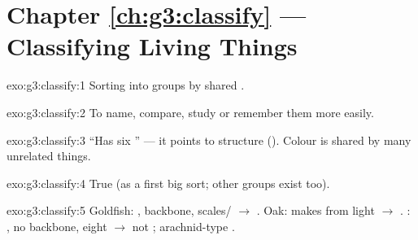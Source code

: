 \section*{Chapter \ref{ch:g3:classify} --- Classifying Living Things}

\begin{solution}{exo:g3:classify:1}
Sorting  into groups by shared .
\end{solution}

\begin{solution}{exo:g3:classify:2}
To name, compare, study or remember them more easily.
\end{solution}

\begin{solution}{exo:g3:classify:3}
``Has six '' --- it points to  structure (). Colour
is shared by many unrelated things.
\end{solution}

\begin{solution}{exo:g3:classify:4}
True (as a first big sort; other groups exist too).
\end{solution}

\begin{solution}{exo:g3:classify:5}
Goldfish: , backbone, scales/ $\to$ . Oak: makes 
from light $\to$ . : , no backbone, eight 
$\to$ not ; arachnid-type .
\end{solution}

